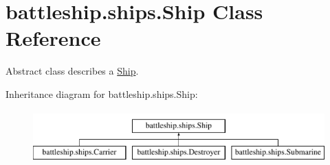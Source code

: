 \hypertarget{classbattleship_1_1ships_1_1Ship}{}\section{battleship.\+ships.\+Ship Class Reference}
\label{classbattleship_1_1ships_1_1Ship}


Abstract class describes a \hyperlink{classbattleship_1_1ships_1_1Ship}{Ship}.  


Inheritance diagram for battleship.\+ships.\+Ship\+:\begin{figure}[H]
\begin{center}
\leavevmode
\includegraphics[height=2.000000cm]{classbattleship_1_1ships_1_1Ship}
\end{center}
\end{figure}
